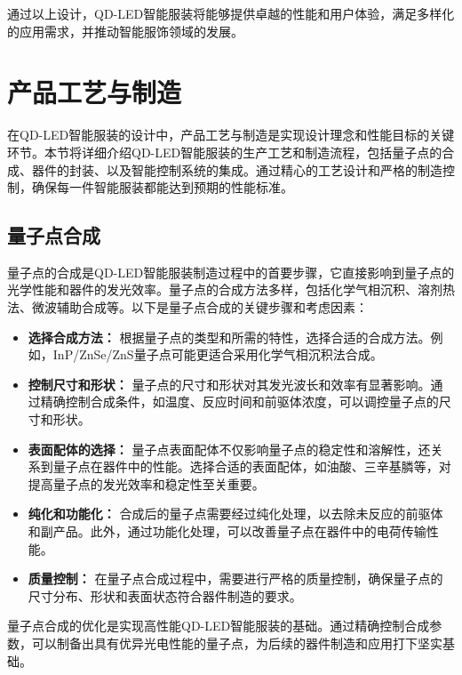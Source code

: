 \documentclass[12pt,hyperref,a4paper,UTF8]{ctexart}
\begin{document}
通过以上设计，QD-LED智能服装将能够提供卓越的性能和用户体验，满足多样化的应用需求，并推动智能服饰领域的发展。


\newpage


\section{产品工艺与制造}
在QD-LED智能服装的设计中，产品工艺与制造是实现设计理念和性能目标的关键环节。本节将详细介绍QD-LED智能服装的生产工艺和制造流程，包括量子点的合成、器件的封装、以及智能控制系统的集成。通过精心的工艺设计和严格的制造控制，确保每一件智能服装都能达到预期的性能标准。

\subsection{量子点合成}
量子点的合成是QD-LED智能服装制造过程中的首要步骤，它直接影响到量子点的光学性能和器件的发光效率。量子点的合成方法多样，包括化学气相沉积、溶剂热法、微波辅助合成等。以下是量子点合成的关键步骤和考虑因素：

\begin{itemize}
  \item \textbf{选择合成方法：} 根据量子点的类型和所需的特性，选择合适的合成方法。例如，InP/ZnSe/ZnS量子点可能更适合采用化学气相沉积法合成。
  
  \item \textbf{控制尺寸和形状：} 量子点的尺寸和形状对其发光波长和效率有显著影响。通过精确控制合成条件，如温度、反应时间和前驱体浓度，可以调控量子点的尺寸和形状。
  
  \item \textbf{表面配体的选择：} 量子点表面配体不仅影响量子点的稳定性和溶解性，还关系到量子点在器件中的性能。选择合适的表面配体，如油酸、三辛基膦等，对提高量子点的发光效率和稳定性至关重要。
  
  \item \textbf{纯化和功能化：} 合成后的量子点需要经过纯化处理，以去除未反应的前驱体和副产品。此外，通过功能化处理，可以改善量子点在器件中的电荷传输性能。
  
  \item \textbf{质量控制：} 在量子点合成过程中，需要进行严格的质量控制，确保量子点的尺寸分布、形状和表面状态符合器件制造的要求。
\end{itemize}

量子点合成的优化是实现高性能QD-LED智能服装的基础。通过精确控制合成参数，可以制备出具有优异光电性能的量子点，为后续的器件制造和应用打下坚实基础。
\end{document}
